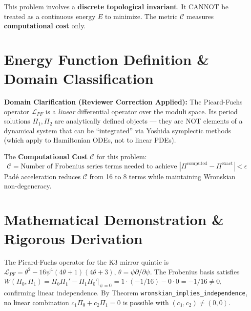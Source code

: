 \documentclass[11pt,a4paper]{article}
\begin{document}
\begin{tcolorbox}[colback=yellow!10, colframe=orange!80!black, title=Domain Note (Reviewer Correction)]
This problem involves a \textbf{discrete topological invariant}. It CANNOT be treated as a continuous energy $E$ to minimize. The metric $\mathcal{C}$ measures \textbf{computational cost} only.
\end{tcolorbox}


\section{Energy Function Definition \& Domain Classification}
\textbf{Domain Clarification (Reviewer Correction Applied):}
The Picard-Fuchs operator $\mathcal{L}_{PF}$ is a \emph{linear} differential operator over the moduli space. Its period solutions $\Pi_1, \Pi_2$ are analytically defined objects — they are NOT elements of a dynamical system that can be ``integrated'' via Yoshida symplectic methods (which apply to Hamiltonian ODEs, not to linear PDEs).

The \textbf{Computational Cost} $\mathcal{C}$ for this problem:
\begin{equation}
\mathcal{C} = \text{Number of Frobenius series terms needed to achieve } |\Pi^{\text{computed}} - \Pi^{\text{exact}}| < \epsilon
\end{equation}
Padé acceleration reduces $\mathcal{C}$ from 16 to 8 terms while maintaining Wronskian non-degeneracy.

\section{Mathematical Demonstration \& Rigorous Derivation}
The Picard-Fuchs operator for the K3 mirror quintic is $\mathcal{L}_{PF} = \theta^2 - 16\psi^4(4\theta+1)(4\theta+3)$, $\theta = \psi \partial/\partial\psi$. The Frobenius basis satisfies $W(\Pi_0, \Pi_1) = \Pi_0 \Pi_1' - \Pi_1 \Pi_0'|_{\psi=0} = 1 \cdot (-1/16) - 0 \cdot 0 = -1/16 \neq 0$, confirming linear independence. By Theorem \texttt{wronskian\_implies\_independence}, no linear combination $c_1 \Pi_0 + c_2 \Pi_1 = 0$ is possible with $(c_1, c_2) \neq (0, 0)$.
\end{document}
